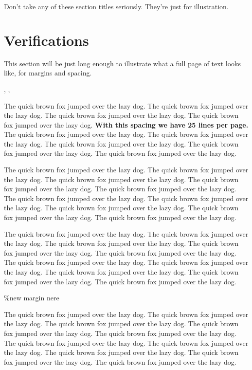 \documentclass[
  12pt]{article}
\begin{document}
Don't take any of these section titles seriously. They're just for
illustration.

\hypertarget{sec-verify}{%
\section{Verifications}\label{sec-verify}}

This section will be just long enough to illustrate what a full page of
text looks like, for margins and spacing.

\addtolength{\textheight}{.5in}%

\citet{Campbell02}, \citet{Schubert13}, \citet{Chi81}

The quick brown fox jumped over the lazy dog. The quick brown fox jumped
over the lazy dog. The quick brown fox jumped over the lazy dog. The
quick brown fox jumped over the lazy dog. \textbf{With this spacing we
have 25 lines per page.} The quick brown fox jumped over the lazy dog.
The quick brown fox jumped over the lazy dog. The quick brown fox jumped
over the lazy dog. The quick brown fox jumped over the lazy dog. The
quick brown fox jumped over the lazy dog.

The quick brown fox jumped over the lazy dog. The quick brown fox jumped
over the lazy dog. The quick brown fox jumped over the lazy dog. The
quick brown fox jumped over the lazy dog. The quick brown fox jumped
over the lazy dog. The quick brown fox jumped over the lazy dog. The
quick brown fox jumped over the lazy dog. The quick brown fox jumped
over the lazy dog. The quick brown fox jumped over the lazy dog. The
quick brown fox jumped over the lazy dog.

The quick brown fox jumped over the lazy dog. The quick brown fox jumped
over the lazy dog. The quick brown fox jumped over the lazy dog. The
quick brown fox jumped over the lazy dog. The quick brown fox jumped
over the lazy dog. The quick brown fox jumped over the lazy dog. The
quick brown fox jumped over the lazy dog. The quick brown fox jumped
over the lazy dog. The quick brown fox jumped over the lazy dog. The
quick brown fox jumped over the lazy dog.

\%new margin nere

The quick brown fox jumped over the lazy dog. The quick brown fox jumped
over the lazy dog. The quick brown fox jumped over the lazy dog. The
quick brown fox jumped over the lazy dog. The quick brown fox jumped
over the lazy dog. The quick brown fox jumped over the lazy dog. The
quick brown fox jumped over the lazy dog. The quick brown fox jumped
over the lazy dog. The quick brown fox jumped over the lazy dog. The
quick brown fox jumped over the lazy dog.
\end{document}
